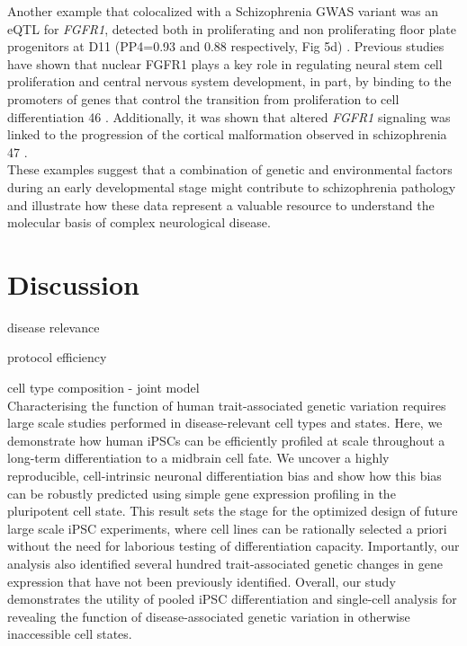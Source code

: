 Another example that colocalized with a Schizophrenia GWAS variant was an eQTL for
\textit{FGFR1}, detected both in proliferating and non proliferating floor plate progenitors at D11 (PP4=0.93 and 0.88 respectively, Fig 5d) . 
Previous studies have shown that nuclear FGFR1 plays a key role in regulating neural stem cell proliferation and central nervous system development, in part, by binding to the promoters of genes that control the transition from proliferation to cell differentiation 46 \cite{ma2009molecular}. 
Additionally, it was shown that altered \textit{FGFR1} signaling was linked to the progression of the cortical malformation observed in schizophrenia 47 \cite{stachowiak2017cerebral}.\\

These examples suggest that a combination of genetic and environmental factors during an early developmental stage might contribute to schizophrenia pathology and illustrate how these data represent a valuable resource to understand the molecular basis of complex neurological disease.

\section{Discussion}

disease relevance

protocol efficiency

cell type composition - joint model\\

Characterising the function of human trait-associated genetic variation requires large scale studies performed in disease-relevant cell types and states. 
Here, we demonstrate how human iPSCs can be efficiently profiled at scale throughout a long-term differentiation to a midbrain cell fate. 
We uncover a highly reproducible, cell-intrinsic neuronal differentiation bias and show how this bias can be robustly predicted using simple gene expression profiling in the pluripotent cell state. 
This result sets the stage for the optimized design of future large scale iPSC experiments, where cell lines can be rationally selected a priori without the need for laborious testing of differentiation capacity. 
Importantly, our analysis also identified several hundred trait-associated genetic changes in gene expression that have not been previously identified. 
Overall, our study demonstrates the utility of pooled iPSC differentiation and single-cell analysis for revealing the function of disease-associated genetic variation in otherwise inaccessible cell states.\\

